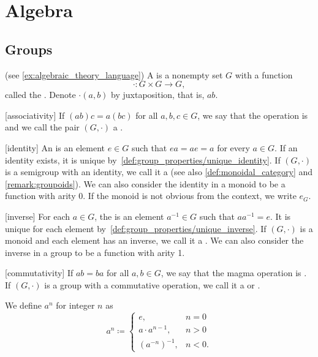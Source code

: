 \section{Algebra}\label{sec:algebra}
\subsection{Groups}\label{subsec:groups}

\begin{definition}\label{def:magma}(see \cref{ex:algebraic_theory_language})
  A  is a nonempty set \( G \) with a function 
  \begin{equation*}
    \cdot: G \times G \to G,
  \end{equation*}
  called the . Denote \( \cdot(a, b) \) by juxtaposition, that is, \( ab \).

  \begin{description}
    [associativity] If \( (ab)c = a(bc) \) for all \( a, b, c \in G \), we say that the operation is  and we call the pair \( (G, \cdot) \) a .

    [identity] An  is an element \( e \in G \) such that \( ea = ae = a \) for every \( a \in G \). If an identity exists, it is unique by~\cref{def:group_properties/unique_identity}. If \( (G, \cdot) \) is a semigroup with an identity, we call it a  (see also \cref{def:monoidal_category} and \cref{remark:groupoids}). We can also consider the identity in a monoid to be a function with arity 0. If the monoid is not obvious from the context, we write \( e_G \).

    [inverse] For each \( a \in G \), the  is an element \( a^{-1} \in G \) such that \( aa^{-1} = e \). It is unique for each element by~\cref{def:group_properties/unique_inverse}. If \( (G, \cdot) \) is a monoid and each element has an inverse, we call it a . We can also consider the inverse in a group to be a function with arity 1.

    [commutativity] If \( ab = ba \) for all \( a, b \in G \), we say that the magma operation is . If \( (G, \cdot) \) is a group with a commutative operation, we call it a  or .
  \end{description}

  We define \( a^n \) for integer \( n \) as
  \begin{equation*}
    a^n \coloneqq \begin{cases}
      e, &n = 0 \\
      a \cdot a^{n-1}, &n > 0 \\
      (a^{-n})^{-1}, &n < 0.
    \end{cases}
  \end{equation*}


\end{definition}
